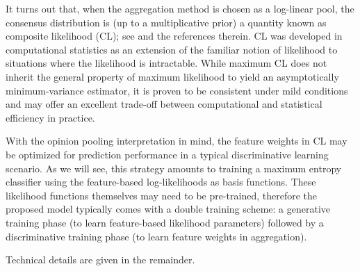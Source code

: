 \documentclass[english]{scrartcl}
\begin{document}
It turns out that, when the aggregation method is chosen as a log-linear pool, the consensus distribution is (up to a multiplicative prior) a quantity known as composite likelihood (CL); see \cite{Varin-11} and the references therein. CL was developed in computational statistics as an extension of the familiar notion of likelihood to situations where the likelihood is intractable. While maximum CL does not inherit the general property of maximum likelihood to yield an asymptotically minimum-variance estimator, it is proven to be consistent under mild conditions \cite{Xu-11} and may offer an excellent trade-off between computational and statistical efficiency in practice.




With the opinion pooling interpretation in mind, the feature weights in CL may be optimized for prediction performance in a typical discriminative learning scenario. As we will see, this strategy amounts to training a maximum entropy classifier using the feature-based log-likelihoods as basis functions. These likelihood functions themselves may need to be pre-trained, therefore the proposed model typically comes with a double training scheme: a generative training phase (to learn feature-based likelihood parameters) followed by a discriminative training phase (to learn feature weights in aggregation).

Technical details are given in the remainder.

\end{document}
